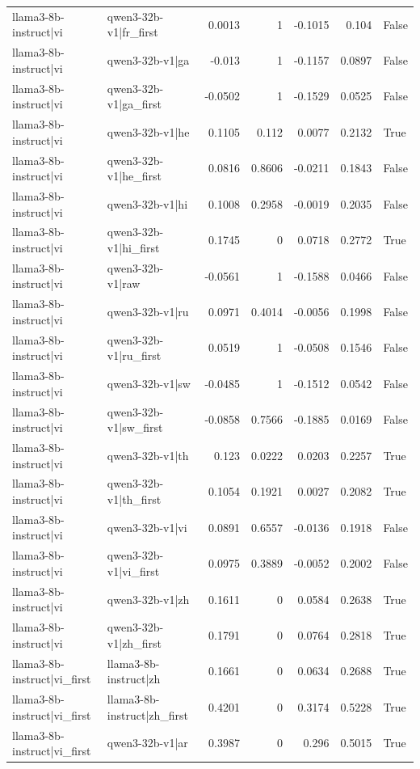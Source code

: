 \begin{table}
\begin{tabular}{l l r r r r l}
llama3-8b-instruct|vi & qwen3-32b-v1|fr_first & 0.0013 & 1 & -0.1015 & 0.104 & False \\
llama3-8b-instruct|vi & qwen3-32b-v1|ga & -0.013 & 1 & -0.1157 & 0.0897 & False \\
llama3-8b-instruct|vi & qwen3-32b-v1|ga_first & -0.0502 & 1 & -0.1529 & 0.0525 & False \\
llama3-8b-instruct|vi & qwen3-32b-v1|he & 0.1105 & 0.112 & 0.0077 & 0.2132 & True \\
llama3-8b-instruct|vi & qwen3-32b-v1|he_first & 0.0816 & 0.8606 & -0.0211 & 0.1843 & False \\
llama3-8b-instruct|vi & qwen3-32b-v1|hi & 0.1008 & 0.2958 & -0.0019 & 0.2035 & False \\
llama3-8b-instruct|vi & qwen3-32b-v1|hi_first & 0.1745 & 0 & 0.0718 & 0.2772 & True \\
llama3-8b-instruct|vi & qwen3-32b-v1|raw & -0.0561 & 1 & -0.1588 & 0.0466 & False \\
llama3-8b-instruct|vi & qwen3-32b-v1|ru & 0.0971 & 0.4014 & -0.0056 & 0.1998 & False \\
llama3-8b-instruct|vi & qwen3-32b-v1|ru_first & 0.0519 & 1 & -0.0508 & 0.1546 & False \\
llama3-8b-instruct|vi & qwen3-32b-v1|sw & -0.0485 & 1 & -0.1512 & 0.0542 & False \\
llama3-8b-instruct|vi & qwen3-32b-v1|sw_first & -0.0858 & 0.7566 & -0.1885 & 0.0169 & False \\
llama3-8b-instruct|vi & qwen3-32b-v1|th & 0.123 & 0.0222 & 0.0203 & 0.2257 & True \\
llama3-8b-instruct|vi & qwen3-32b-v1|th_first & 0.1054 & 0.1921 & 0.0027 & 0.2082 & True \\
llama3-8b-instruct|vi & qwen3-32b-v1|vi & 0.0891 & 0.6557 & -0.0136 & 0.1918 & False \\
llama3-8b-instruct|vi & qwen3-32b-v1|vi_first & 0.0975 & 0.3889 & -0.0052 & 0.2002 & False \\
llama3-8b-instruct|vi & qwen3-32b-v1|zh & 0.1611 & 0 & 0.0584 & 0.2638 & True \\
llama3-8b-instruct|vi & qwen3-32b-v1|zh_first & 0.1791 & 0 & 0.0764 & 0.2818 & True \\
llama3-8b-instruct|vi_first & llama3-8b-instruct|zh & 0.1661 & 0 & 0.0634 & 0.2688 & True \\
llama3-8b-instruct|vi_first & llama3-8b-instruct|zh_first & 0.4201 & 0 & 0.3174 & 0.5228 & True \\
llama3-8b-instruct|vi_first & qwen3-32b-v1|ar & 0.3987 & 0 & 0.296 & 0.5015 & True \\

\end{tabular}
\end{table}
